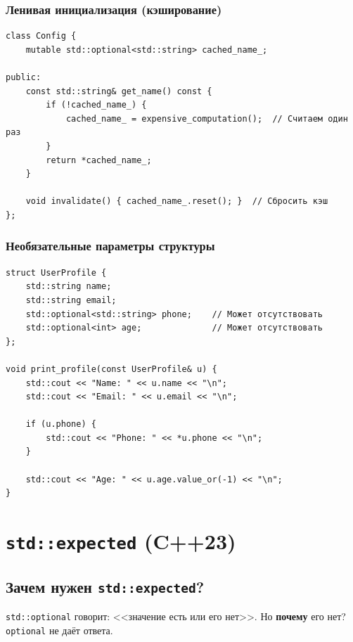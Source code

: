 \documentclass[a4paper,12pt]{article}
\begin{document}
\subsubsection{Ленивая инициализация (кэширование)}

\begin{lstlisting}
class Config {
    mutable std::optional<std::string> cached_name_;

public:
    const std::string& get_name() const {
        if (!cached_name_) {
            cached_name_ = expensive_computation();  // Считаем один раз
        }
        return *cached_name_;
    }

    void invalidate() { cached_name_.reset(); }  // Сбросить кэш
};
\end{lstlisting}

\subsubsection{Необязательные параметры структуры}

\begin{lstlisting}
struct UserProfile {
    std::string name;
    std::string email;
    std::optional<std::string> phone;    // Может отсутствовать
    std::optional<int> age;              // Может отсутствовать
};

void print_profile(const UserProfile& u) {
    std::cout << "Name: " << u.name << "\n";
    std::cout << "Email: " << u.email << "\n";

    if (u.phone) {
        std::cout << "Phone: " << *u.phone << "\n";
    }

    std::cout << "Age: " << u.age.value_or(-1) << "\n";
}
\end{lstlisting}

\newpage
\section{\texttt{std::expected} (C++23)}

\subsection{Зачем нужен \texttt{std::expected}?}

\texttt{std::optional} говорит: <<значение есть или его нет>>. Но \textbf{почему}
его нет? \texttt{optional} не даёт ответа.
\end{document}

